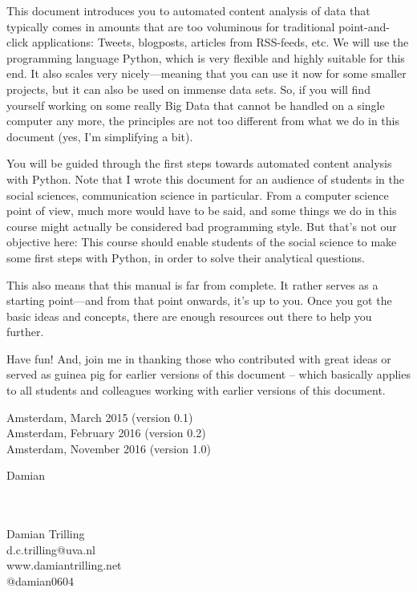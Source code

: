 \documentclass[a4paper,12pt]{book}
\begin{document}
This document introduces you to automated content analysis of data that typically comes in amounts that are too voluminous for traditional point-and-click applications: Tweets, blogposts, articles from RSS-feeds, etc. We will use the programming language Python, which is very flexible and highly suitable for this end. It also scales very nicely---meaning that you can use it now for some smaller projects, but it can also be used on immense data sets. So, if you will find yourself working on some really Big Data that cannot be handled on a single computer any more, the principles are not too different from what we do in this document (yes, I'm simplifying a bit).

You will be guided through the first steps towards automated content analysis with Python. Note that I wrote this document for an audience of students in the social sciences, communication science in particular. From a computer science point of view, much more would have to be said, and some things we do in this course might actually be considered bad programming style. But that's not our objective here: This course should enable students of the social science to make some first steps with Python, in order to solve their analytical questions.

This also means that this manual is far from complete. It rather serves as a starting point---and from that point onwards, it's up to you. Once you got the basic ideas and concepts, there are enough resources out there to help you further.

Have fun! And, join me in thanking those who contributed with great ideas or served as guinea pig for earlier versions of this document -- which basically applies to all students and colleagues working with earlier versions of this document. 

\vspace{.5cm}

\begin{flushright}
Amsterdam, March 2015 (version 0.1)\\
Amsterdam, February 2016 (version 0.2)\\
Amsterdam, November 2016 (version 1.0)
\end{flushright}

Damian



\begin{flushright}
~\\~\\Damian Trilling\\
d.c.trilling@uva.nl\\
www.damiantrilling.net\\
@damian0604

\end{flushright}
\end{document}
